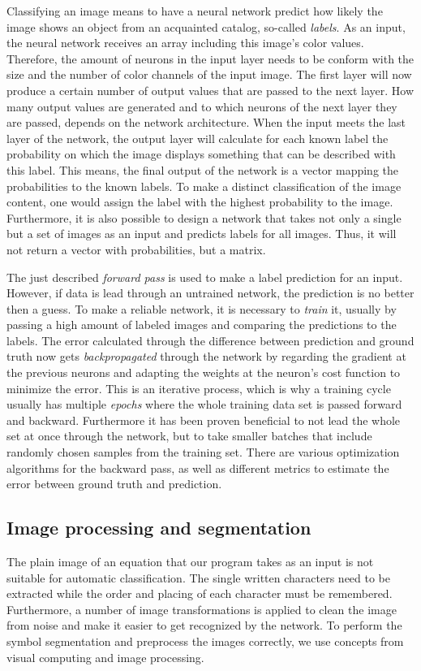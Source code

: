 \documentclass[11pt]{article}
\begin{document}
	Classifying an image means to have a neural network predict how likely the image shows an object from an acquainted catalog, so-called \textit{labels}. As an input, the neural network receives an array including this image's color values. Therefore, the amount of neurons in the input layer needs to be conform with the size and the number of color channels of the input image. The first layer will now produce a certain number of output values that are passed to the next layer. How many output values are generated and to which neurons of the next layer they are passed, depends on the network architecture. When the input meets the last layer of the network, the output layer will calculate for each known label the probability on which the image displays something that can be described with this label. This means, the final output of the network is a vector mapping the probabilities to the known labels. To make a distinct classification of the image content, one would assign the label with the highest probability to the image. Furthermore, it is also possible to design a network that takes not only a single but a set of images as an input and predicts labels for all images. Thus, it will not return a vector with probabilities, but a matrix.
	
	The just described \textit{forward pass} is used to make a label prediction for an input. However, if data is lead through an untrained network, the prediction is no better then a guess. To make a reliable network, it is necessary to \textit{train} it, usually by passing a high amount of labeled images and comparing the predictions to the labels. The error calculated through the difference between prediction and ground truth now gets \textit{backpropagated} through the network by regarding the gradient at the previous neurons and adapting the weights at the neuron's cost function to minimize the error. This is an iterative process, which is why a training cycle usually has multiple \textit{epochs} where the whole training data set is passed forward and backward. Furthermore it has been proven beneficial to not lead the whole set at once through the network, but to take smaller batches that include randomly chosen samples from the training set. There are various optimization algorithms for the backward pass, as well as different metrics to estimate the error between ground truth and prediction.

	\subsection{Image processing and segmentation}
	The plain image of an equation that our program takes as an input is not suitable for automatic classification. The single written characters need to be extracted while the order and placing of each character must be remembered. Furthermore, a number of image transformations is applied to clean the image from noise and make it easier to get recognized by the network. To perform the symbol segmentation and preprocess the images correctly, we use concepts from visual computing and image processing.	
\end{document}
